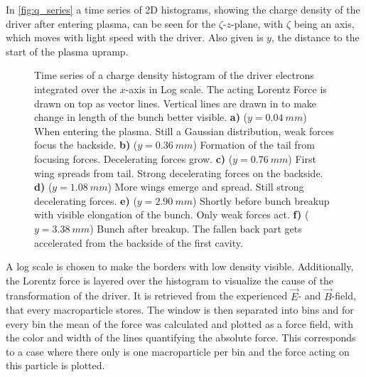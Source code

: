 \documentclass[bachelor_thesis]{subfiles}
\begin{document}
In \autoref{fig:q_series} a time series of 2D histograms, showing the charge density of the driver after entering plasma, can be seen for the $\zeta$-$z$-plane, with $\zeta$ being an axis, which moves with light speed with the driver. Also given is $y$, the distance to the start of the plasma upramp.
\begin{figure}
	\centering
	
	\caption{Time series of a charge density histogram of the driver electrons integrated over the $x$-axis in Log scale. The acting Lorentz Force is drawn on top as vector lines. Vertical lines are drawn in to make change in length of the bunch better visible. 
	\textbf{a)} ($y=\qty{0.04}{mm}$) When entering the plasma. Still a Gaussian distribution, weak forces focus the backside.
	\textbf{b)} ($y=\qty{0.36}{mm}$) Formation of the tail from focusing forces. Decelerating forces grow.
	\textbf{c)} ($y=\qty{0.76}{mm}$) First wing spreads from tail. Strong decelerating forces on the backside.
	\textbf{d)} ($y=\qty{1.08}{mm}$) More wings emerge and spread. Still strong decelerating forces.
	\textbf{e)} ($y=\qty{2.90}{mm}$) Shortly before bunch breakup with visible elongation of the bunch. Only weak forces act.
	\textbf{f)} ($y=\qty{3.38}{mm}$) Bunch after breakup. The fallen back part gets accelerated from the backside of the first cavity.}
	\label{fig:q_series}
\end{figure}
A log scale is chosen to make the borders with low density visible. Additionally, the Lorentz force is layered over the histogram to visualize the cause of the transformation of the driver. It is retrieved from the experienced $\vec{E}$- and $\vec{B}$-field, that every macroparticle stores.
The window is then separated into bins and for every bin the mean of the force was calculated and plotted as a force field, with the color and width of the lines quantifying the absolute force. 
This corresponds to a case where there only is one macroparticle per bin and the force acting on this particle is plotted.
\end{document}
